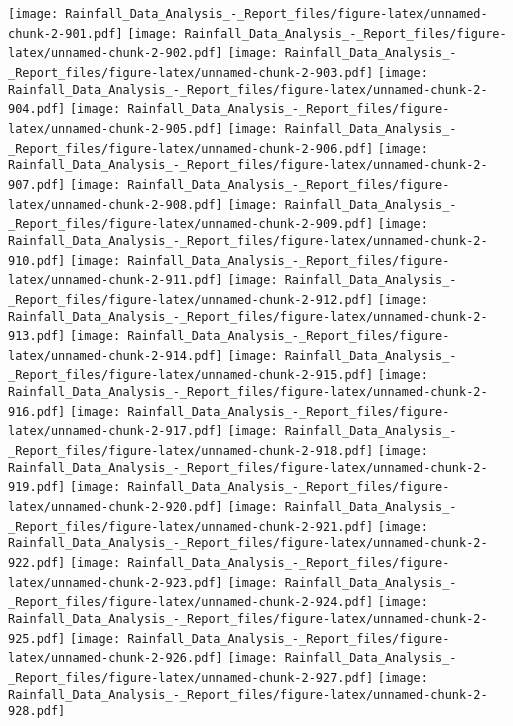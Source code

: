 \documentclass[
]{article}
\begin{document}
\texttt{[image: Rainfall\_Data\_Analysis\_-\_Report\_files/figure-latex/unnamed-chunk-2-901.pdf]}
\texttt{[image: Rainfall\_Data\_Analysis\_-\_Report\_files/figure-latex/unnamed-chunk-2-902.pdf]}
\texttt{[image: Rainfall\_Data\_Analysis\_-\_Report\_files/figure-latex/unnamed-chunk-2-903.pdf]}
\texttt{[image: Rainfall\_Data\_Analysis\_-\_Report\_files/figure-latex/unnamed-chunk-2-904.pdf]}
\texttt{[image: Rainfall\_Data\_Analysis\_-\_Report\_files/figure-latex/unnamed-chunk-2-905.pdf]}
\texttt{[image: Rainfall\_Data\_Analysis\_-\_Report\_files/figure-latex/unnamed-chunk-2-906.pdf]}
\texttt{[image: Rainfall\_Data\_Analysis\_-\_Report\_files/figure-latex/unnamed-chunk-2-907.pdf]}
\texttt{[image: Rainfall\_Data\_Analysis\_-\_Report\_files/figure-latex/unnamed-chunk-2-908.pdf]}
\texttt{[image: Rainfall\_Data\_Analysis\_-\_Report\_files/figure-latex/unnamed-chunk-2-909.pdf]}
\texttt{[image: Rainfall\_Data\_Analysis\_-\_Report\_files/figure-latex/unnamed-chunk-2-910.pdf]}
\texttt{[image: Rainfall\_Data\_Analysis\_-\_Report\_files/figure-latex/unnamed-chunk-2-911.pdf]}
\texttt{[image: Rainfall\_Data\_Analysis\_-\_Report\_files/figure-latex/unnamed-chunk-2-912.pdf]}
\texttt{[image: Rainfall\_Data\_Analysis\_-\_Report\_files/figure-latex/unnamed-chunk-2-913.pdf]}
\texttt{[image: Rainfall\_Data\_Analysis\_-\_Report\_files/figure-latex/unnamed-chunk-2-914.pdf]}
\texttt{[image: Rainfall\_Data\_Analysis\_-\_Report\_files/figure-latex/unnamed-chunk-2-915.pdf]}
\texttt{[image: Rainfall\_Data\_Analysis\_-\_Report\_files/figure-latex/unnamed-chunk-2-916.pdf]}
\texttt{[image: Rainfall\_Data\_Analysis\_-\_Report\_files/figure-latex/unnamed-chunk-2-917.pdf]}
\texttt{[image: Rainfall\_Data\_Analysis\_-\_Report\_files/figure-latex/unnamed-chunk-2-918.pdf]}
\texttt{[image: Rainfall\_Data\_Analysis\_-\_Report\_files/figure-latex/unnamed-chunk-2-919.pdf]}
\texttt{[image: Rainfall\_Data\_Analysis\_-\_Report\_files/figure-latex/unnamed-chunk-2-920.pdf]}
\texttt{[image: Rainfall\_Data\_Analysis\_-\_Report\_files/figure-latex/unnamed-chunk-2-921.pdf]}
\texttt{[image: Rainfall\_Data\_Analysis\_-\_Report\_files/figure-latex/unnamed-chunk-2-922.pdf]}
\texttt{[image: Rainfall\_Data\_Analysis\_-\_Report\_files/figure-latex/unnamed-chunk-2-923.pdf]}
\texttt{[image: Rainfall\_Data\_Analysis\_-\_Report\_files/figure-latex/unnamed-chunk-2-924.pdf]}
\texttt{[image: Rainfall\_Data\_Analysis\_-\_Report\_files/figure-latex/unnamed-chunk-2-925.pdf]}
\texttt{[image: Rainfall\_Data\_Analysis\_-\_Report\_files/figure-latex/unnamed-chunk-2-926.pdf]}
\texttt{[image: Rainfall\_Data\_Analysis\_-\_Report\_files/figure-latex/unnamed-chunk-2-927.pdf]}
\texttt{[image: Rainfall\_Data\_Analysis\_-\_Report\_files/figure-latex/unnamed-chunk-2-928.pdf]}
\end{document}
